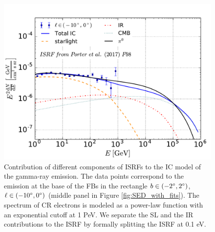 \begin{figure}[h]
\includegraphics[width=\twopic\textwidth]{plots/SED_ISRF_componentsboxes_source_0_F98}
\caption{Contribution of different components of ISRFs to the IC model of the gamma-ray emission.
The data points correspond to the emission at the base of the FBs in the rectangle $b \in (-2^\circ, 2^\circ)$, $\ell \in (-10^\circ, 0^\circ)$
(middle panel in Figure \ref{fig:SED_with_fits}).
The spectrum of CR electrons is modeled as a power-law function with an exponential  cutoff at 1 PeV.
We separate the SL and the IR contributions to the ISRF by formally splitting the ISRF at 0.1 eV.}
\label{fig:GC_CR}
\end{figure}




